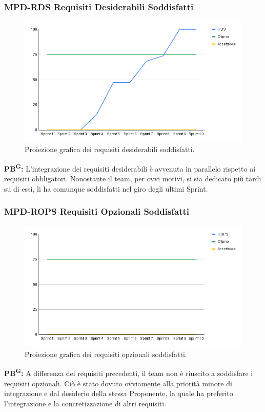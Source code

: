 \documentclass[8pt]{article}
\newcommand{\glossterm}[1]{#1\textsuperscript{G}} %
\begin{document}
\subsubsection{MPD-RDS Requisiti Desiderabili Soddisfatti}
\begin{figure}[h!]
    \centering
    \includegraphics[width=1\textwidth]{images_pdq/RDS.png}
    \caption{Proiezione grafica dei requisiti desiderabili soddisfatti.}
    \label{fig:Proiezione grafica dei desiderabili obbligatori soddisfatti}
\end{figure}
\textbf{\glossterm{PB}:} L'integrazione dei requisiti desiderabili è avvenuta in parallelo rispetto ai requisiti obbligatori. Nonostante il team, per ovvi motivi, si sia dedicato più tardi su di essi, li ha comunque soddisfatti nel giro degli ultimi Sprint.
\clearpage
\subsubsection{MPD-ROPS Requisiti Opzionali Soddisfatti}
\begin{figure}[h!]
    \centering
    \includegraphics[width=1\textwidth]{images_pdq/ROPS.png}
    \caption{Proiezione grafica dei requisiti opzionali soddisfatti.}
    \label{fig:Proiezione grafica dei requisiti opzionali soddisfatti}
\end{figure}
\textbf{\glossterm{PB}:} A differenza dei requisiti precedenti, il team non è riuscito a soddisfare i requisiti opzionali. Ciò è stato dovuto ovviamente alla priorità minore di integrazione e dal desiderio della stessa Proponente, la quale ha preferito l'integrazione e la concretizzazione di altri requisiti.
\clearpage
\end{document}
